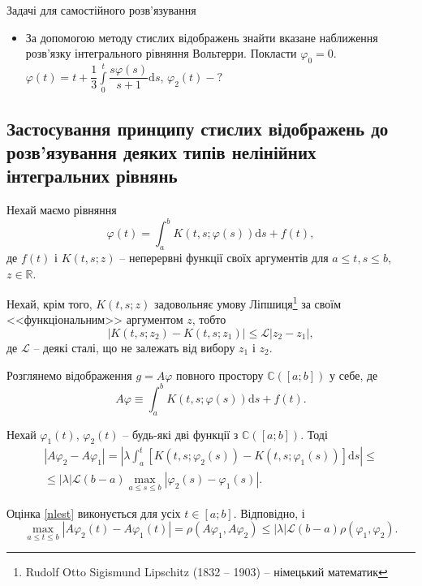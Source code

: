 \documentclass[14pt,twoside]{extreport}
\theoremstyle{mystyle}
\newcommand{\problems}{\bigskip\noindent\fbox{\HandPencilLeft}\hspace{6pt}\textsf{Задачі
		для самостійного розв'язування}}
\numberwithin{equation}{chapter}
\newcommand{\cab}{\mathbb{C}([a; b])}
\begin{document}
\begin{small}
\problems
\begin{itemize}
	\item За допомогою методу стислих відображень знайти вказане наближення розв'язку інтегрального рівняння Вольтерри. Покласти $\varphi_0=0$. $\varphi(t) = t + \dfrac{1}{3}\int\limits_{0}^{t} \dfrac{s\varphi(s)}{s+1} \mathrm{d}s$, $\varphi_2(t) - ?$
\end{itemize}
\end{small}

\subsection{Застосування принципу стислих відображень до розв'язування деяких типів нелінійних інтегральних рівнянь}

Нехай маємо рівняння
\begin{equation}\label{nlfred}
 \varphi(t) = \int_{a}^{b} K(t, s; \varphi(s)) \mathrm{d}s + f(t),
\end{equation}
де $f(t)$ і $K(t, s; z)$ -- неперервні функції своїх аргументів для $a \leqslant t, s \leqslant b$, $z\in \mathbb{R}$.

Нехай, крім того, $K(t, s; z)$ задовольняє умову Ліпшиця\footnote{Rudolf Otto Sigismund Lipschitz (1832 -- 1903) -- німецький математик} за своїм <<функціональним>> аргументом $z$, тобто
\[
 |K(t, s; z_2) - K(t, s; z_1)| \leqslant \mathscr{L} |z_2 -z_1|,
\]
де $\mathscr{L}$ -- деякі сталі, що не залежать від вибору $z_1$ і $z_2$.

Розглянемо відображення $g = A\varphi$ повного простору $\cab$ у себе, де
\begin{equation}
 A\varphi \equiv \int_{a}^{b} K(t, s; \varphi(s)) \mathrm{d}s + f(t).
\end{equation}

Нехай $\varphi_1(t)$, $\varphi_2(t)$ -- будь-які дві функції з $\cab$. Тоді
\begin{multline}\label{nlest}
 |A\varphi_2 - A\varphi_1| = \left|\lambda \int_{a}^{t} [K(t, s; \varphi_2(s)) - K(t, s; \varphi_1(s))]\mathrm{d}s\right|\leqslant\\
 \leqslant |\lambda| \mathscr{L} (b-a) \max\limits_{a \leqslant s \leqslant b} |\varphi_2(s) - \varphi_1(s)|.
\end{multline}

Оцінка \eqref{nlest} виконується для усіх $t \in [a; b]$. Відповідно, і
\[
 \max\limits_{a \leqslant t \leqslant b} |A\varphi_2(t) - A\varphi_1(t)| = \rho(A\varphi_1, A\varphi_2) \leqslant |\lambda| \mathscr{L}(b-a) \rho(\varphi_1, \varphi_2).
\]
\end{document}
